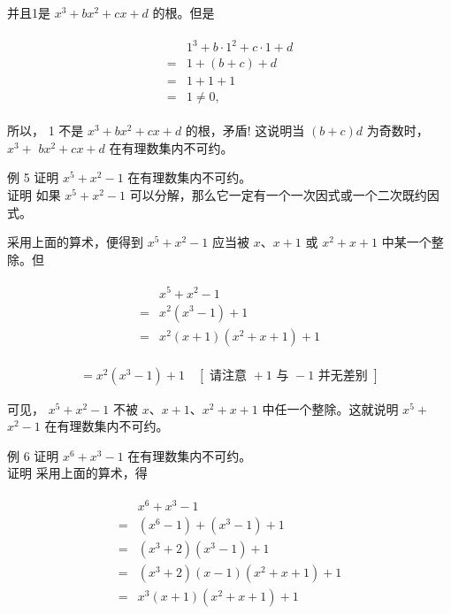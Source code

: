 \documentclass[10pt]{article}
\begin{document}
并且1是 $x^{3}+b x^{2}+c x+d$ 的根。但是

\begin{align*}
\begin{aligned}
& 1^{3}+b \cdot 1^{2}+c \cdot 1+d \\
= & 1+(b+c)+d \\
= & 1+1+1 \\
= & 1 \neq 0,
\end{aligned}
\end{align*}

所以， 1 不是 $x^{3}+b x^{2}+c x+d$ 的根，矛盾! 这说明当 $(b+c) d$ 为奇数时， $x^{3}+$ $b x^{2}+c x+d$ 在有理数集内不可约。

例 5 证明 $x^{5}+x^{2}-1$ 在有理数集内不可约。\\
证明 如果 $x^{5}+x^{2}-1$ 可以分解，那么它一定有一个一次因式或一个二次既约因式。

采用上面的算术，便得到 $x^{5}+x^{2}-1$ 应当被 $x 、 x+1$ 或 $x^{2}+x+1$ 中某一个整除。但

\begin{align*}
\begin{aligned}
& x^{5}+x^{2}-1 \\
= & x^{2}\left(x^{3}-1\right)+1 \\
= & x^{2}(x+1)\left(x^{2}+x+1\right)+1
\end{aligned}
\end{align*}

\begin{align*}
=x^{2}\left(x^{3}-1\right)+1 \quad[\text { 请注意 }+1 \text { 与 }-1 \text { 并无差别 }]
\end{align*}

可见， $x^{5}+x^{2}-1$ 不被 $x 、 x+1 、 x^{2}+x+1$ 中任一个整除。这就说明 $x^{5}+$ $x^{2}-1$ 在有理数集内不可约。

例 6 证明 $x^{6}+x^{3}-1$ 在有理数集内不可约。\\
证明 采用上面的算术，得

\begin{align*}
\begin{aligned}
& x^{6}+x^{3}-1 \\
= & \left(x^{6}-1\right)+\left(x^{3}-1\right)+1 \\
= & \left(x^{3}+2\right)\left(x^{3}-1\right)+1 \\
= & \left(x^{3}+2\right)(x-1)\left(x^{2}+x+1\right)+1 \\
= & x^{3}(x+1)\left(x^{2}+x+1\right)+1
\end{aligned}
\end{align*}
\end{document}

